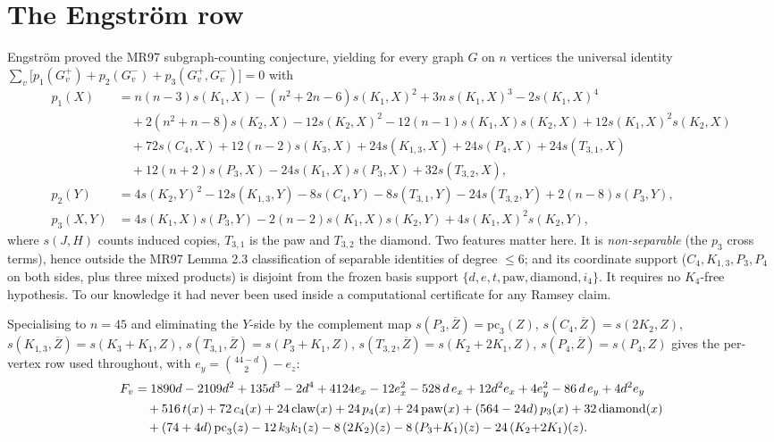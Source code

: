 \documentclass[11pt]{article}
\theoremstyle{definition}
\begin{document}
\section{The Engstr\"om row}\label{sec:row}

Engstr\"om \cite{engstrom2010} proved the MR97 subgraph-counting conjecture,
yielding for every graph $G$ on $n$ vertices the universal identity
$\sum_v\big[p_1(G_v^{+})+p_2(G_v^{-})+p_3(G_v^{+},G_v^{-})\big]=0$ with
\begin{align*}
p_1(X)&=n(n-3)s(K_1,X)-(n^2+2n-6)s(K_1,X)^2+3n\,s(K_1,X)^3-2s(K_1,X)^4\\
&\quad+2(n^2+n-8)s(K_2,X)-12s(K_2,X)^2-12(n-1)s(K_1,X)s(K_2,X)+12s(K_1,X)^2s(K_2,X)\\
&\quad+72s(C_4,X)+12(n-2)s(K_3,X)+24s(K_{1,3},X)+24s(P_4,X)+24s(T_{3,1},X)\\
&\quad+12(n+2)s(P_3,X)-24s(K_1,X)s(P_3,X)+32s(T_{3,2},X),\\
p_2(Y)&=4s(K_2,Y)^2-12s(K_{1,3},Y)-8s(C_4,Y)-8s(T_{3,1},Y)-24s(T_{3,2},Y)+2(n-8)s(P_3,Y),\\
p_3(X,Y)&=4s(K_1,X)s(P_3,Y)-2(n-2)s(K_1,X)s(K_2,Y)+4s(K_1,X)^2s(K_2,Y),
\end{align*}
where $s(J,H)$ counts induced copies, $T_{3,1}$ is the paw and $T_{3,2}$ the
diamond. Two features matter here. It is \emph{non-separable} (the $p_3$ cross
terms), hence outside the MR97 Lemma 2.3 classification of separable identities
of degree $\le6$; and its coordinate support
($C_4,K_{1,3},P_3,P_4$ on both sides, plus three mixed products) is disjoint
from the frozen basis support $\{d,e,t,\mathrm{paw},\mathrm{diamond},i_4\}$.
It requires no $K_4$-free hypothesis. To our knowledge it had never been used
inside a computational certificate for any Ramsey claim.

Specialising to $n=45$ and eliminating the $Y$-side by the complement map
$s(P_3,\overline Z)=\mathrm{pc}_3(Z)$, $s(C_4,\overline Z)=s(2K_2,Z)$,
$s(K_{1,3},\overline Z)=s(K_3{+}K_1,Z)$,
$s(T_{3,1},\overline Z)=s(P_3{+}K_1,Z)$,
$s(T_{3,2},\overline Z)=s(K_2{+}2K_1,Z)$, $s(P_4,\overline Z)=s(P_4,Z)$ gives the
per-vertex row used throughout, with $e_y=\binom{44-d}{2}-e_z$:
\begin{align}\label{eq:F}
F_v &= 1890d-2109d^2+135d^3-2d^4+4124e_x-12e_x^2-528\,d\,e_x+12d^2e_x
      +4e_y^2-86\,d\,e_y+4d^2e_y\notag\\
&\quad +516\,t(x)+72\,c_4(x)+24\,\mathrm{claw}(x)+24\,p_4(x)+24\,\mathrm{paw}(x)
      +(564-24d)\,p_3(x)+32\,\mathrm{diamond}(x)\notag\\
&\quad +(74+4d)\,\mathrm{pc}_3(z)-12\,k_3k_1(z)-8\,(2K_2)(z)-8\,(P_3{+}K_1)(z)
      -24\,(K_2{+}2K_1)(z).
\end{align}
\end{document}
